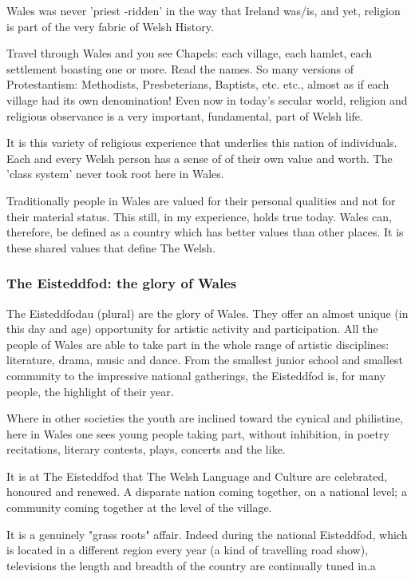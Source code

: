 \documentclass{article}
\begin{document}
Wales was never 'priest -ridden' in the way that Ireland was/is, and yet, religion is part of the very fabric of Welsh History.

Travel through Wales and you see Chapels: each village, each hamlet, each settlement boasting  one or more.
Read the names.
So many versions of Protestantism: Methodists, Presbeterians, Baptists, etc. etc., almost as if each village had its own denomination!
Even now in today's secular world, religion and religious observance is a very important, fundamental, part of Welsh life.

It is this variety of religious experience that underlies this nation of individuals.
Each and every Welsh person has a sense of of their own value and worth.
The 'class system' never took root here in Wales.

Traditionally people in Wales are valued for their personal qualities and not for their material status.
This still, in my experience, holds true today.
Wales can, therefore, be defined as a country which has better values than other places.
It is these shared values  that define The Welsh.

\subsubsection{The Eisteddfod: the glory of Wales}
The Eisteddfodau (plural) are the glory of Wales.
They offer an almost unique (in this day and age) opportunity for artistic activity and participation.
All the people of Wales are able to take part in the whole range of artistic disciplines: literature, drama, music and dance.
From the smallest junior school and smallest community to the impressive national gatherings, the Eisteddfod is, for many people, the highlight of their year.

Where in other societies the youth are inclined toward the cynical and philistine, here in Wales one sees young people taking part, without inhibition, in poetry recitations, literary contests, plays, concerts and the like.

It is at The Eisteddfod that The Welsh Language and Culture are celebrated, honoured and renewed.
A disparate nation coming together, on a national level; a community coming together at the level of the village.

It is a genuinely "grass roots" affair.
Indeed during the national Eisteddfod, which is located in a different region every year (a kind of travelling road show), televisions the length and breadth of the country are continually tuned in.a
\end{document}
